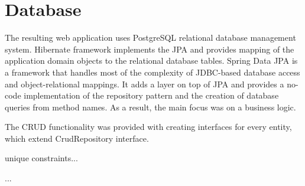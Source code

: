\section{Database}
The resulting web application uses PostgreSQL relational database management system. Hibernate framework implements the JPA and provides mapping of the application domain objects to the relational database tables. Spring Data JPA is a framework that handles most of the complexity of JDBC-based database access and object-relational mappings. It adds a layer on top of JPA and provides a no-code implementation of the repository pattern and the creation of database queries from method names. As a result, the main focus was on a business logic.

The CRUD functionality was provided with creating interfaces for every entity, which extend CrudRepository interface.


unique constraints...

...



